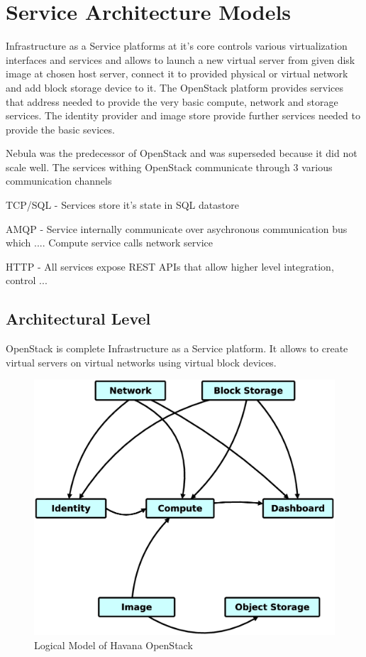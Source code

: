 
\section{Service Architecture Models}
\label{chap:service}

Infrastructure as a Service platforms at it's core controls various virtualization interfaces and services and allows to launch a new virtual server from given disk image at chosen host server, connect it to provided physical or virtual network and add block storage device to it. The OpenStack platform provides services that address needed to provide the very basic compute, network and storage services. The identity provider and image store  provide further services needed to provide the basic sevices.

Nebula was the predecessor of OpenStack and was superseded because it did not scale well. The services withing OpenStack communicate through 3 various communication channels

TCP/SQL - Services store it's state in SQL datastore

AMQP - Service internally communicate over asychronous communication bus which .... Compute service calls network service 

HTTP - All services expose REST APIs that allow higher level integration, control ...

\subsection{Architectural Level}

OpenStack is complete Infrastructure as a Service platform. It allows to create virtual servers on virtual networks using virtual block devices.


\begin{figure}[!h]
\centering
\includegraphics[scale=.2]{img/openstack_logical_model.eps}
\caption{Logical Model of Havana OpenStack}
\label{fig:cm}
\end{figure}

